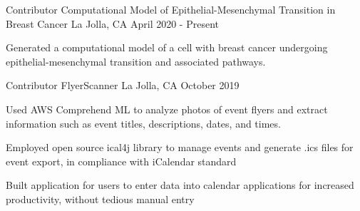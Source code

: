 \begin{cventries}

\cventry
{Contributor} %
{Computational Model of Epithelial-Mesenchymal Transition in Breast Cancer} %
{La Jolla, CA} %
{April 2020 - Present} %
{
    \begin{cvitems} %
        \item {Generated a computational model of a cell with breast cancer undergoing epithelial-mesenchymal transition and associated pathways.}
    \end{cvitems}
}
  \cventry
    {Contributor} %
    {FlyerScanner} %
    {La Jolla, CA} %
    {October 2019} %
    {
      \begin{cvitems} %
        \item {Used AWS Comprehend ML to analyze photos of event flyers and extract information such as event titles, descriptions, dates, and times.}
        \item {Employed open source ical4j library to manage events and generate .ics files for event export, in compliance with iCalendar standard}
        \item {Built application for users to enter data into calendar applications for increased productivity, without tedious manual entry}
      \end{cvitems}
    }
\end{cventries}